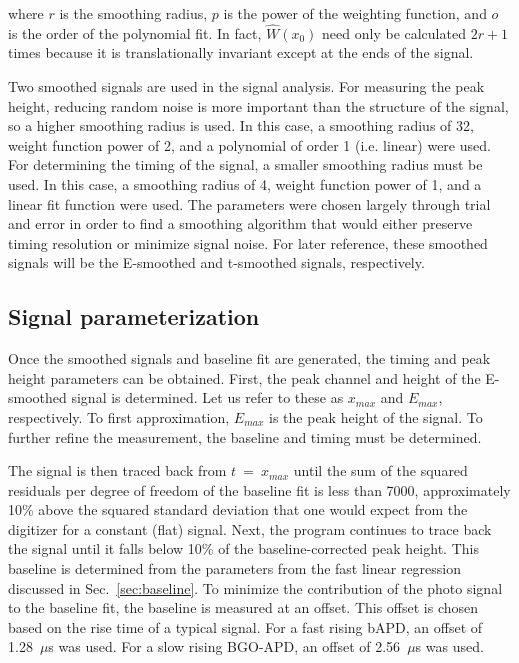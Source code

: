 \documentclass[oneside,12pt]{memoir}
\begin{document}
where $r$ is the smoothing radius, $p$ is the power of the weighting function, and $o$ is the order of the polynomial fit. In fact, $\hat W\left(x_0\right)$ need only be calculated $2r+1$ times because it is translationally invariant except at the ends of the signal.\par
Two smoothed signals are used in the signal analysis. For measuring the peak height, reducing random noise is more important than the structure of the signal, so a higher smoothing radius is used. In this case, a smoothing radius of 32, weight function power of 2, and a polynomial of order 1 (i.e. linear) were used. For determining the timing of the signal, a smaller smoothing radius must be used. In this case, a smoothing radius of 4, weight function power of 1, and a linear fit function were used. The parameters were chosen largely through trial and error in order to find a smoothing algorithm that would either preserve timing resolution or minimize signal noise. For later reference, these smoothed signals will be the E-smoothed and t-smoothed signals, respectively.\par
\subsection{Signal parameterization}
\label{sec:parameters}
Once the smoothed signals and baseline fit are generated, the timing and peak height parameters can be obtained. First, the peak channel and height of the E-smoothed signal is determined. Let us refer to these as $x_{max}$ and $E_{max}$, respectively. To first approximation, $E_{max}$ is the peak height of the signal. To further refine the measurement, the baseline and timing must be determined.\par
The signal is then traced back from $t~=~x_{max}$ until the sum of the squared residuals per degree of freedom of the baseline fit is less than 7000, approximately 10\% above the squared standard deviation that one would expect from the digitizer for a constant (flat) signal. Next, the program continues to trace back the signal until it falls below 10\% of the baseline-corrected peak height. This baseline is determined from the parameters from the fast linear regression discussed in Sec.~\ref{sec:baseline}. To minimize the contribution of the photo signal to the baseline fit, the baseline is measured at an offset. This offset is chosen based on the rise time of a typical signal. For a fast rising bAPD, an offset of 1.28~$\mu$s was used. For a slow rising BGO-APD, an offset of 2.56~$\mu$s was used.\par
\end{document}
